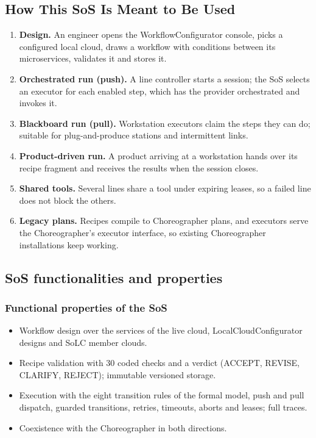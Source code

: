 \documentclass[a4paper]{arrowhead}
\begin{document}
\subsection{How This SoS Is Meant to Be Used}
\label{sec:use}
\begin{enumerate}
\item \textbf{Design.} An engineer opens the WorkflowConfigurator console, picks a configured local cloud, draws a
workflow with conditions between its microservices, validates it and stores it.
\item \textbf{Orchestrated run (push).} A line controller starts a session; the SoS selects an executor for each
enabled step, which has the provider orchestrated and invokes it.
\item \textbf{Blackboard run (pull).} Workstation executors claim the steps they can do; suitable for plug-and-produce
stations and intermittent links.
\item \textbf{Product-driven run.} A product arriving at a workstation hands over its recipe fragment and receives the
results when the session closes.
\item \textbf{Shared tools.} Several lines share a tool under expiring leases, so a failed line does not block the others.
\item \textbf{Legacy plans.} Recipes compile to Choreographer plans, and executors serve the Choreographer's executor
interface, so existing Choreographer installations keep working.
\end{enumerate}

\subsection{SoS functionalities and properties}
\label{sec:properties}
\subsubsection{Functional properties of the SoS}
\begin{itemize}
\item Workflow design over the services of the live cloud, LocalCloudConfigurator designs and SoLC member clouds.
\item Recipe validation with 30 coded checks and a verdict (ACCEPT, REVISE, CLARIFY, REJECT); immutable versioned storage.
\item Execution with the eight transition rules of the formal model, push and pull dispatch, guarded transitions,
retries, timeouts, aborts and leases; full traces.
\item Coexistence with the Choreographer in both directions.
\end{itemize}
\end{document}
